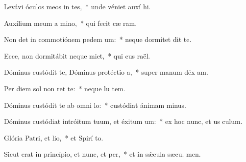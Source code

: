 \item Levávi óculos meos in tes,~* unde véniet auxí hi.
\item Auxílium meum a mino,~* qui fecit cæ  ram.
\item Non det in commotiónem pedem um:~* neque dormítet  dit te.
\item Ecce, non dormitábit neque miet,~* qui cus raël.
\item Dóminus custódit te, Dóminus protéctio a,~* super manum déx am.
\item Per diem sol non ret te:~* neque lu  tem.
\item Dóminus custódit te ab omni lo:~* custódiat ánimam  minus.
\item Dóminus custódiat intróitum tuum, et éxitum um:~* ex hoc nunc, et us  culum.
\item Glória Patri, et lio,~* et Spirí to.
\item Sicut erat in princípio, et nunc, et per,~* et in sǽcula sæcu. men.
